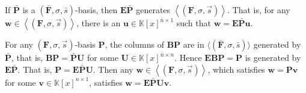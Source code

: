 \begin{comment}
\begin{lem}
If $\mathbf{P}_{1}$ is a $\left(\mathbf{F},\sigma,\vec{s}\right)_{-\alpha}$-basis
, then $\left[\mathbf{B}\mathbf{P}_{1},\mathbf{A}\right]$ is a basis
for $\left\langle \left(\bar{\mathbf{F}},\sigma,\bar{s}\right)\right\rangle _{-\alpha}$.\end{lem}
\begin{pf}
We know that if $\bar{\mathbf{w}}$ has order $\left(\bar{\mathbf{F}},\sigma\right)$
then $\mathbf{E}\bar{\mathbf{w}}$ has order $\left(\vec{\mathbf{F}},\sigma\right)$.
Also if $\deg_{\bar{s}}\bar{\mathbf{w}}\le-\alpha$, then $\deg_{\vec{s}}\mathbf{E}\bar{\mathbf{w}}\le-\alpha$
by \prettyref{lem:degEwLessEqDegw}. Therefore, if $\bar{\mathbf{w}}\in\left\langle \left(\bar{\mathbf{F}},\sigma,\bar{s}\right)\right\rangle _{-\alpha}$
, then $\mathbf{E}\bar{\mathbf{w}}\in\left\langle \left(\mathbf{F},\sigma,\vec{s}\right)\right\rangle _{-\alpha}$.
Now apply the same procedure as in \prettyref{lem:PtoBPA}, we get
$\bar{\mathbf{w}}=\mathbf{w}^{[1]}-\mathbf{A}\mathbf{u}^{[1]}=\mathbf{B}\mathbf{E}\bar{\mathbf{w}}-\mathbf{A}\mathbf{u}^{[1]}=\mathbf{B}\mathbf{P}_{1}\mathbf{v}-\mathbf{A}\mathbf{u}^{[1]}=\left[\mathbf{B}\mathbf{P}_{1},\mathbf{A}\right][\mathbf{v},-\mathbf{u}^{[1]}]^{T}.$
Also as before, the columns of $\mathbf{A}$ and the columns of $\mathbf{B}\mathbf{P}_{1}$
are linearly independent. 
\end{pf}

\end{comment}
{} 
\begin{lem}
\label{lem:EPgeneration}If $\bar{\mathbf{P}}$ is a $\left(\bar{\mathbf{F}},\sigma,\bar{s}\right)$-basis,
then $\mathbf{E}\bar{\mathbf{P}}$ generates $\left\langle \left(\mathbf{F},\sigma,\vec{s}\right)\right\rangle $.
That is, for any $\mathbf{w}\in\left\langle \left(\mathbf{F},\sigma,\vec{s}\right)\right\rangle $,
there is an $\mathbf{u}\in\mathbb{K}\left[x\right]^{\bar{n}\times1}$
such that $\mathbf{w}=\mathbf{E}\bar{\mathbf{P}}\mathbf{u}$.\end{lem}
\begin{pf}
For any $\left(\mathbf{F},\sigma,\vec{s}\right)$-basis $\mathbf{P}$,
the columns of $\mathbf{B}\mathbf{P}$ are in $\langle(\bar{\mathbf{F}},\sigma,\bar{s})\rangle$
generated by $\bar{\mathbf{P}}$, that is, $\mathbf{B}\mathbf{P}=\bar{\mathbf{P}}\mathbf{U}$
for some $\mathbf{U}\in\mathbb{K}[x]^{\bar{n}\times n}$. Hence $\mathbf{E}\mathbf{B}\mathbf{P}=\mathbf{P}$
is generated by $\mathbf{E}\bar{\mathbf{P}}$. That is, $\mathbf{P}=\mathbf{E}\bar{\mathbf{P}}\mathbf{U}$.
Then any $\mathbf{w}\in\left\langle \left(\mathbf{F},\sigma,\vec{s}\right)\right\rangle $,
which satisfies $\mathbf{w}=\mathbf{P}\mathbf{v}$ for some $\mathbf{v}\in\mathbb{K}[x]^{n\times1}$,
satisfies $\mathbf{w}=\mathbf{E}\bar{\mathbf{P}}\mathbf{U}\mathbf{v}$. 
\end{pf}
